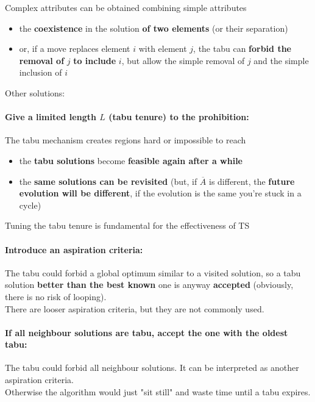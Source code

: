 \documentclass[11pt]{article}
\begin{document}
	Complex attributes can be obtained combining simple attributes
	\begin{itemize}
		\item the \textbf{coexistence} in the solution \textbf{of two elements} (or their separation) 
		\item or, if a move replaces element $i$ with element $j$, the tabu can \textbf{forbid the removal of} $j$ \textbf{to include} $i$, but allow the simple removal of $j$ and the simple inclusion of $i$
	\end{itemize}
	
	\newpage
	
	Other solutions:
	
	\paragraph{Give a limited length $L$ (tabu tenure) to the prohibition:} The tabu mechanism creates regions hard or impossible to reach
	\begin{itemize}
		\item the \textbf{tabu solutions} become \textbf{feasible again after a while}
		
		\item the \textbf{same solutions can be revisited} (but, if $\overline{A}$ is different, the \textbf{future evolution will be different}, if the evolution is the same you're stuck in a cycle)
	\end{itemize}
	
	Tuning the tabu tenure is fundamental for the effectiveness of TS\\
	
	\paragraph{Introduce an aspiration criteria:} The tabu could forbid a global optimum similar to a visited solution, so a tabu solution \textbf{better than the best known} one is anyway \textbf{accepted} (obviously, there is no risk of looping).\\
	
	There are looser aspiration criteria, but they are not commonly used.\\
	
	\paragraph{If all neighbour solutions are tabu, accept the one with the oldest tabu:} The tabu could forbid all neighbour solutions. It can be interpreted as another aspiration criteria.\\
	Otherwise the algorithm would just "sit still" and waste time until a tabu expires.\\
	
\end{document}
